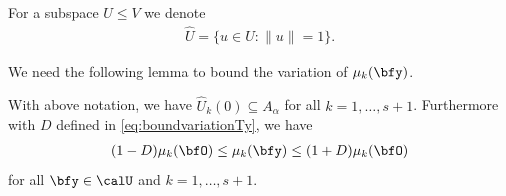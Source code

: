  For a subspace $U \leq V$ we denote
\begin{align}\label{eq:subspacehat}
   \hat U = \{ u \in U :  \| u \| = 1 \}.
\end{align}

We need the following lemma to bound the variation of $\mu_k(\bfy)$.

\begin{lemma}\label{lemma:boundEigenvalueVariation}  With above notation, we have $ \hat U_k(0) \subseteq A_{\alpha}$ for all $k = 1,\ldots,s+1$.
Furthermore with $D$ defined in \eqref{eq:boundvariationTy}, we have
    \begin{align*}
        (1-D) \mu_k (\bfO)\leq\mu_k(\bfy)  \leq (1+D) \mu_k(\bfO)
    \end{align*}
for all $\bfy \in \calU$ and $k =1,\ldots, s+1$.
\end{lemma}

